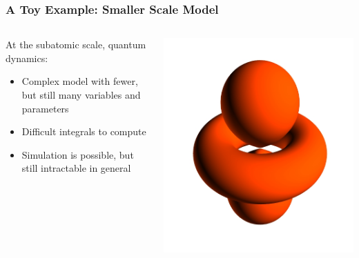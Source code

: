 \documentclass[aspectratio=169, 12pt]{beamer}
\begin{document}
\begin{frame}

    \frametitle{A Toy Example: Smaller Scale Model}

    \begin{columns}
        
    \begin{column}{.6\textwidth}
        At the subatomic scale, quantum dynamics:

        \begin{itemize}
            \item Complex model with fewer, but still many variables and  parameters
            \item Difficult integrals to compute
            \item Simulation is possible, but still intractable in general
        \end{itemize}
    \end{column}
    \begin{column}{.4\textwidth}
        \includegraphics[width=\textwidth]{images/hydrogen-atom.jpg}
    \end{column}
    \end{columns}

\end{frame}
\end{document}
